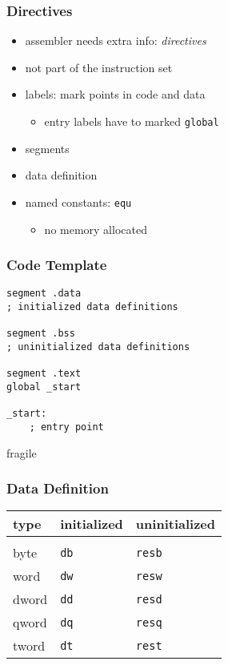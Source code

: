 \documentclass[dvipsnames]{beamer}
\begin{document}
\begin{frame}
  \frametitle{Directives}

  \begin{itemize}
    \item assembler needs extra info: \emph{directives}
    \item not part of the instruction set

    \bigskip
    \item labels: mark points in code and data
    \begin{itemize}
      \item entry labels have to marked \lstinline|global|
    \end{itemize}

    \item segments

    \item data definition

    \item named constants: \lstinline|equ|
    \begin{itemize}
      \item no memory allocated
    \end{itemize}
  \end{itemize}
\end{frame}

\begin{frame}[fragile]
  \frametitle{Code Template}

  \begin{lstlisting}
segment .data
; initialized data definitions

segment .bss
; uninitialized data definitions

segment .text
global _start

_start:
    ; entry point
  \end{lstlisting}
\end{frame}

\begin{frame}{fragile}
  \frametitle{Data Definition}

  \begin{table}
    \begin{tabular}{lll}
      type  & initialized        & uninitialized\\
      \hline\\
      byte  & \lstinline|db| & \lstinline|resb|\\
      \hline
      word  & \lstinline|dw| & \lstinline|resw|\\
      \hline
      dword & \lstinline|dd| & \lstinline|resd|\\
      \hline
      qword & \lstinline|dq| & \lstinline|resq|\\
      \hline
      tword & \lstinline|dt| & \lstinline|rest|\\
    \end{tabular}
  \end{table}
\end{frame}
\end{document}
